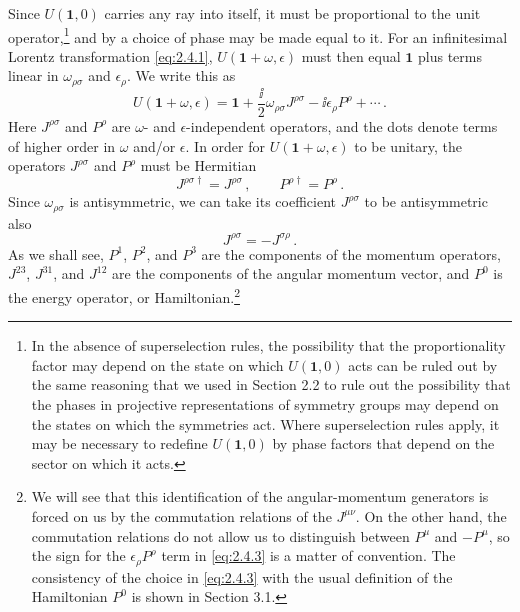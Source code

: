 Since $U(\mathbf{1},0)$ carries any ray into itself, it must be proportional to the unit
operator,\footnote{In the absence of superselection rules, the possibility that
the proportionality factor may depend on the state on which $U(\mathbf{1},0)$ acts can
be ruled out by the same reasoning that we used in Section 2.2 to rule out the
possibility that the phases in projective representations of symmetry groups
may depend on the states on which the symmetries act. Where superselection
rules apply, it may be necessary to redefine $U(\mathbf{1},0)$ by phase factors that
depend on the sector on which it acts.} and by a choice of phase may be made
equal to it. For an infinitesimal Lorentz transformation \eqref{eq:2.4.1},
$U(\mathbf{1}+\omega,\epsilon)$ must then equal $\mathbf{1}$ plus terms linear in $\omega_{\rho\sigma}$
and $\epsilon_\rho$. We write this as
\begin{equation}
U(\mathbf{1}+\omega,\epsilon)
=\mathbf{1}+\frac{\ii}{2}\omega_{\rho\sigma}J^{\rho\sigma}
-\ii\epsilon_\rho P^\rho+\cdots\,.
\tag{2.4.3}\label{eq:2.4.3}
\end{equation}
Here $J^{\rho\sigma}$ and $P^\rho$ are $\omega$- and $\epsilon$-independent
operators, and the dots denote terms of higher order in $\omega$ and/or
$\epsilon$. In order for $U(\mathbf{1}+\omega,\epsilon)$ to be unitary, the operators
$J^{\rho\sigma}$ and $P^\rho$ must be Hermitian
\begin{equation}
J^{\rho\sigma\dagger}=J^{\rho\sigma}\,,
\qquad P^{\rho\dagger}=P^\rho\,.
\tag{2.4.4}\label{eq:2.4.4}
\end{equation}
Since $\omega_{\rho\sigma}$ is antisymmetric, we can take its coefficient
$J^{\rho\sigma}$ to be antisymmetric also
\begin{equation}
J^{\rho\sigma}=-J^{\sigma\rho}\,.
\tag{2.4.5}\label{eq:2.4.5}
\end{equation}
As we shall see, $P^1$, $P^2$, and $P^3$ are the components of the momentum
operators, $J^{23}$, $J^{31}$, and $J^{12}$ are the components of the angular
momentum vector, and $P^0$ is the energy operator, or
Hamiltonian.\footnote{We will see that this identification of the
angular-momentum generators is forced on us by the commutation relations of
the $J^{\mu\nu}$. On the other hand, the commutation relations do not allow us
to distinguish between $P^\mu$ and $-P^\mu$, so the sign for the
$\epsilon_\rho P^\rho$ term in \eqref{eq:2.4.3} is a matter of convention. The
consistency of the choice in \eqref{eq:2.4.3} with the usual definition of the
Hamiltonian $P^0$ is shown in Section 3.1.}

